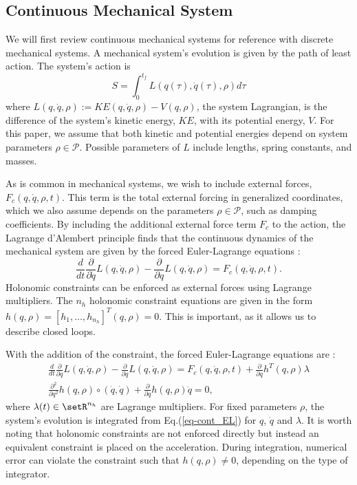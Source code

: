 \documentclass[letterpaper, 10pt, conference]{ieeeconf}
\begin{document}
\subsection{Continuous Mechanical System}
We will first review continuous mechanical systems for reference with discrete mechanical systems.  A mechanical system's evolution is given by the path of least action.  The system's action is 
\[
S = \int_0^{t_f}L(q(\tau),\dot{q}(\tau),\rho)d\tau
\]
where $L(q,\dot{q},\rho) := KE(q,\dot{q},\rho) - V(q,\rho)$, the system Lagrangian, is the difference of the system's kinetic energy, $KE$, with its potential energy, $V$.  For this paper, we assume that both kinetic and potential energies depend on system parameters $\rho\in\mathcal{P}$.  Possible parameters of $L$ include lengths, spring constants, and masses. 

As is common in mechanical systems, we wish to include external forces, $F_c(q,\dot{q},\rho,t)$.  This term is the total external forcing in generalized coordinates, which we also assume depends on the parameters $\rho\in\mathcal{P}$, such as damping coefficients.  By including the additional external force term $F_c$ to the action, the Lagrange d'Alembert principle finds that the continuous dynamics of the mechanical system are given by the forced Euler-Lagrange equations \cite{murray_li_sastry}:
\[
\frac{d}{d t}\frac{\partial}{\partial \dot{q}}L(q,\dot{q},\rho) - \frac{\partial}{\partial q}L(q,\dot{q},\rho) = F_c(q,\dot{q},\rho,t).
\]
Holonomic constraints can be enforced as external forces using Lagrange multipliers.  The $n_h$ holonomic constraint equations are given in the form $h(q,\rho)= [h_1,\ldots,h_{n_h}]^T(q,\rho) = 0$. This is important, as it allows us to describe closed loops. 

With the addition of the constraint, the forced Euler-Lagrange equations are \cite{murray_li_sastry}:
\begin{equation}
\begin{array}{c}
\frac{d}{d t}\frac{\partial}{\partial \dot{q}}L(q,\dot{q},\rho) - \frac{\partial}{\partial q}L(q,\dot{q},\rho) = F_c(q,\dot{q},\rho,t) + \frac{\partial}{\partial q}h^T(q,\rho)\lambda\\
\frac{\partial^2}{\partial q^2}h(q,\rho)\circ(\dot{q},\dot{q}) + \frac{\partial}{\partial q}h(q,\rho)\ddot{q} = 0,
\end{array}
\label{eq-cont_EL}
\end{equation}
where $\lambda(t)\in\setR^{n_h}$ are Lagrange multipliers.  For fixed parameters $\rho$, the system's evolution is integrated from Eq.(\ref{eq-cont_EL}) for $q$, $\dot{q}$ and $\lambda$.  It is worth noting that holonomic constraints are not enforced directly but instead an equivalent constraint is placed on the acceleration.  During integration, numerical error can violate the constraint such that  $h(q,\rho)\neq 0$, depending on the type of integrator.
\end{document}

